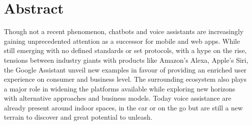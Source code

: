 %
%
%


\newpage
\chapter*{Abstract}

Though not a recent phenomenon, chatbots and voice assistants are increasingly gaining unprecedented attention as a successor for mobile and web apps. While still emerging with no defined standards or set protocols, with a hype on the rise, tensions between industry giants with products like Amazon's Alexa, Apple's Siri, the Google Assistant %
unveil new examples in favour of providing an enriched user experience on consumer and business level. The surrounding ecosystem also plays a major role in widening the platforms available while exploring new horizons with alternative approaches and business models. Today voice assistance are already present around indoor spaces, in the car or on the go but are still a new terrain to discover and great potential to unleash. 

